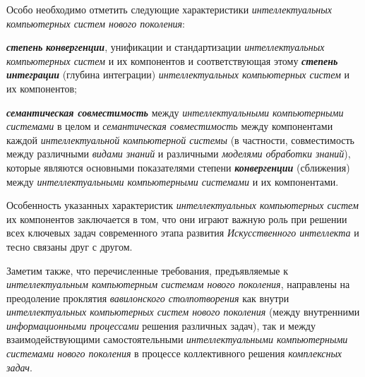 Особо необходимо отметить следующие характеристики \textit{интеллектуальных компьютерных систем нового поколения}:
\begin{textitemize}
	\item \textbf{\textit{степень}} \textbf{\textit{конвергенции}}, унификации и стандартизации \textit{интеллектуальных компьютерных систем} и их компонентов и соответствующая этому \textbf{\textit{степень интеграции}} (глубина интеграции) \textit{интеллектуальных компьютерных систем} и их компонентов;
	\item \textbf{\textit{семантическая совместимость}} между \textit{интеллектуальными компьютерными системами} в целом и \textit{семантическая совместимость} между компонентами каждой \textit{интеллектуальной компьютерной системы} (в частности, совместимость между различными \textit{видами знаний} и различными \textit{моделями обработки знаний}), которые являются основными показателями степени \textbf{\textit{конвергенции}} (сближения) между \textit{интеллектуальными компьютерными системами} и их компонентами.
\end{textitemize}

Особенность указанных характеристик \textit{интеллектуальных компьютерных систем} их компонентов заключается в том, что они играют важную роль при решении всех ключевых задач современного этапа развития \textit{Искусственного интеллекта} и тесно связаны друг с другом.

Заметим также, что перечисленные требования, предъявляемые к \textit{интеллектуальным компьютерным системам нового поколения}, направлены на преодоление проклятия \textit{вавилонского столпотворения} как внутри \textit{интеллектуальных компьютерных систем нового поколения} (между внутренними \textit{информационными процессами} решения различных задач), так и между взаимодействующими самостоятельными \textit{интеллектуальными компьютерными системами нового поколения} в процессе коллективного решения \textit{комплексных задач}.

